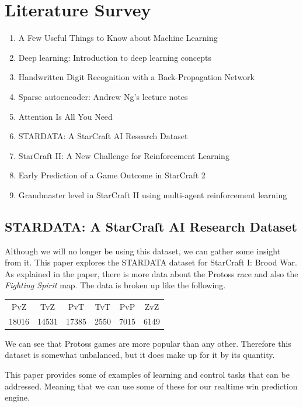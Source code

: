 \documentclass[a4paper,12pt]{report}
\begin{document}
\section{Literature Survey}

\begin{enumerate}\setlength\itemsep{-.1cm}
\item A Few Useful Things to Know about Machine Learning
\item Deep learning: Introduction to deep learning concepts
\item Handwritten Digit Recognition with a Back-Propagation Network
\item Sparse autoencoder: Andrew Ng’s lecture notes
\item Attention Is All You Need
\item STARDATA: A StarCraft AI Research Dataset
\item StarCraft II: A New Challenge for Reinforcement Learning
\item Early Prediction of a Game Outcome in StarCraft 2
\item Grandmaster level in StarCraft II using multi-agent reinforcement learning
\end{enumerate}

\subsection{STARDATA: A StarCraft AI Research Dataset}

Although we will no longer be using this dataset, we can gather some insight from it. This paper explores the STARDATA dataset for StarCraft I: Brood War. As explained in the paper, there is more data about the Protoss race and also the \textit{Fighting Spirit} map. The data is broken up like the following.

\begin{center}
    \begin{tabular}{cccccc}
        \hline PvZ & TvZ & PvT & TvT & PvP & ZvZ \\
        18016 & 14531 & 17385 & 2550 & 7015 & 6149 \\ \hline
    \end{tabular}
\end{center}

We can see that Protoss games are more popular than any other. Therefore this dataset is somewhat unbalanced, but it does make up for it by its quantity.

This paper provides some of examples of learning and control tasks that can be addressed. Meaning that we can use some of these for our realtime win prediction engine.
\end{document}
